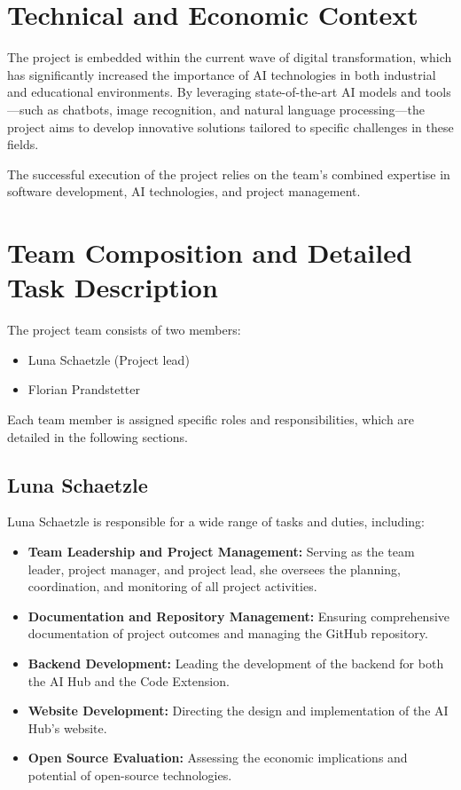 \section{Technical and Economic Context}

The project is embedded within the current wave of digital transformation, which has significantly increased the importance of AI technologies in both industrial and educational environments. By leveraging state-of-the-art AI models and tools—such as chatbots, image recognition, and natural language processing—the project aims to develop innovative solutions tailored to specific challenges in these fields.

The successful execution of the project relies on the team’s combined expertise in software development, AI technologies, and project management.

\section{Team Composition and Detailed Task Description}

The project team consists of two members:
\begin{itemize}
    \item Luna Schaetzle (Project lead)
    \item Florian Prandstetter
\end{itemize}

Each team member is assigned specific roles and responsibilities, which are detailed in the following sections.

\subsection{Luna Schaetzle}

Luna Schaetzle is responsible for a wide range of tasks and duties, including:
\begin{itemize}
    \item \textbf{Team Leadership and Project Management:} Serving as the team leader, project manager, and project lead, she oversees the planning, coordination, and monitoring of all project activities.
    \item \textbf{Documentation and Repository Management:} Ensuring comprehensive documentation of project outcomes and managing the GitHub repository.
    \item \textbf{Backend Development:} Leading the development of the backend for both the AI Hub and the Code Extension.
    \item \textbf{Website Development:} Directing the design and implementation of the AI Hub's website.
    \item \textbf{Open Source Evaluation:} Assessing the economic implications and potential of open-source technologies.
\end{itemize}


